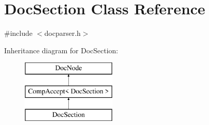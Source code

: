 \hypertarget{class_doc_section}{}\section{Doc\+Section Class Reference}
\label{class_doc_section}


{\ttfamily \#include $<$docparser.\+h$>$}

Inheritance diagram for Doc\+Section\+:\begin{figure}[H]
\begin{center}
\leavevmode
\includegraphics[height=3.000000cm]{class_doc_section}
\end{center}
\end{figure}
